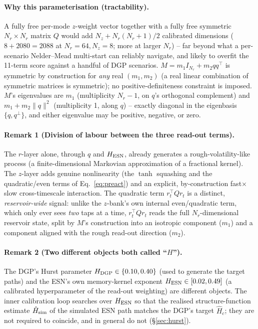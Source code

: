 \documentclass[11pt,a4paper]{article}
\begin{document}
\paragraph{Why this parameterisation (tractability).} A fully free
per-mode $z$-weight vector together with a fully free symmetric
$N_r\times N_r$ matrix $Q$ would add $N_z+N_r(N_r+1)/2$ calibrated
dimensions ($8+2080=2088$ at $N_r=64,N_z=8$; more at larger $N_r$) --
far beyond what a per-scenario Nelder--Mead multi-start can reliably
navigate, and likely to overfit the 11-term score against a handful of
DGP scenarios. $M=m_1I_{N_r}+m_2qq^\top$ is symmetric by construction
for \emph{any} real $(m_1,m_2)$ (a real linear combination of symmetric
matrices is symmetric); no positive-definiteness constraint is
imposed. $M$'s eigenvalues are $m_1$ (multiplicity $N_r-1$, on $q$'s
orthogonal complement) and $m_1+m_2\|q\|^2$ (multiplicity 1, along
$q$) -- exactly diagonal in the eigenbasis $\{q,q^\perp\}$, and either
eigenvalue may be positive, negative, or zero.

\paragraph{Remark 1 (Division of labour between the three read-out
terms).} The $r$-layer alone, through $q$ and $H_{\rm ESN}$, already
generates a rough-volatility-like process (a finite-dimensional
Markovian approximation of a fractional kernel). The $z$-layer adds
genuine nonlinearity (the $\tanh$ squashing and the quadratic/even
terms of Eq.~\eqref{eq:preact}) and an explicit, by-construction
fast$\times$slow cross-timescale interaction. The quadratic term
$r_t^\top Qr_t$ is a distinct, \emph{reservoir-wide} signal: unlike the
$z$-bank's own internal even/quadratic term, which only ever sees
\emph{two} taps at a time, $r_t^\top Qr_t$ reads the full
$N_r$-dimensional reservoir state, split by $M$'s construction into an
isotropic component ($m_1$) and a component aligned with the rough
read-out direction ($m_2$).

\paragraph{Remark 2 (Two different objects both called ``$H$'').}
The DGP's Hurst parameter $H_{\rm DGP}\in\{0.10,0.40\}$ (used to
generate the target paths) and the ESN's own memory-kernel exponent
$H_{\rm ESN}\in[0.02,0.49]$ (a calibrated hyperparameter of the
read-out weighting) are different objects. The inner calibration loop
searches over $H_{\rm ESN}$ so that the realised structure-function
estimate $\hat H_{\rm sim}$ of the simulated ESN path matches the
DGP's target $\hat H_c$; they are not required to coincide, and in
general do not (\S\ref{sec:hurst}).
\end{document}
